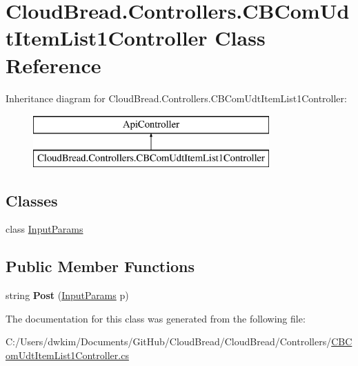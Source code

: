 \hypertarget{class_cloud_bread_1_1_controllers_1_1_c_b_com_udt_item_list1_controller}{}\section{Cloud\+Bread.\+Controllers.\+C\+B\+Com\+Udt\+Item\+List1\+Controller Class Reference}
\label{class_cloud_bread_1_1_controllers_1_1_c_b_com_udt_item_list1_controller}
Inheritance diagram for Cloud\+Bread.\+Controllers.\+C\+B\+Com\+Udt\+Item\+List1\+Controller\+:\begin{figure}[H]
\begin{center}
\leavevmode
\includegraphics[height=2.000000cm]{class_cloud_bread_1_1_controllers_1_1_c_b_com_udt_item_list1_controller}
\end{center}
\end{figure}
\subsection*{Classes}
\begin{DoxyCompactItemize}
\item 
class \hyperlink{class_cloud_bread_1_1_controllers_1_1_c_b_com_udt_item_list1_controller_1_1_input_params}{Input\+Params}
\end{DoxyCompactItemize}
\subsection*{Public Member Functions}
\begin{DoxyCompactItemize}
\item 
string {\bfseries Post} (\hyperlink{class_cloud_bread_1_1_controllers_1_1_c_b_com_udt_item_list1_controller_1_1_input_params}{Input\+Params} p)\hypertarget{class_cloud_bread_1_1_controllers_1_1_c_b_com_udt_item_list1_controller_a7acb4a9373b37377aff95ce255e6a694}{}\label{class_cloud_bread_1_1_controllers_1_1_c_b_com_udt_item_list1_controller_a7acb4a9373b37377aff95ce255e6a694}

\end{DoxyCompactItemize}


The documentation for this class was generated from the following file\+:\begin{DoxyCompactItemize}
\item 
C\+:/\+Users/dwkim/\+Documents/\+Git\+Hub/\+Cloud\+Bread/\+Cloud\+Bread/\+Controllers/\hyperlink{_c_b_com_udt_item_list1_controller_8cs}{C\+B\+Com\+Udt\+Item\+List1\+Controller.\+cs}\end{DoxyCompactItemize}
